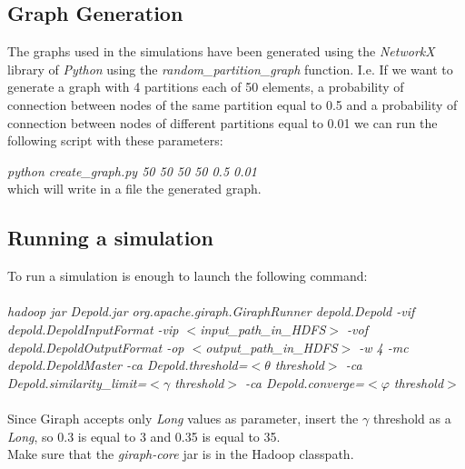 \documentclass[12pt]{article}
\begin{document}
\subsection{Graph Generation}
\label{sec:generation}
The graphs used in the simulations have been generated using the \emph{NetworkX} library of \emph{Python} using the \emph{random\_partition\_graph} function. I.e. If we want to generate a graph with 4 partitions each of 50 elements, a probability of connection between nodes of the same partition equal to 0.5 and a probability of connection between nodes of different partitions equal to 0.01 we can run the following script with these parameters:

\emph{python create\_graph.py 50 50 50 50 0.5 0.01}\\
which will write in a file the generated graph.
\subsection{Running a simulation}
To run a simulation is enough to launch the following command: \\\\
    \emph{hadoop jar Depold.jar org.apache.giraph.GiraphRunner depold.Depold -vif depold.DepoldInputFormat -vip $<$input\_path\_in\_HDFS$>$ -vof depold.DepoldOutputFormat -op $<$output\_path\_in\_HDFS$>$ -w 4 -mc depold.DepoldMaster -ca Depold.threshold=$<\theta$ threshold$>$ -ca Depold.similarity\_limit=$<\gamma$ threshold$>$ -ca Depold.converge=$<\varphi$ threshold$>$}\\\\
    Since Giraph accepts only \emph{Long} values as parameter, insert the $\gamma$ threshold as a \emph{Long}, so 0.3 is equal to 3 and 0.35 is equal to 35.\\
    Make sure that the \emph{giraph-core} jar is in the Hadoop classpath.
\end{document}
